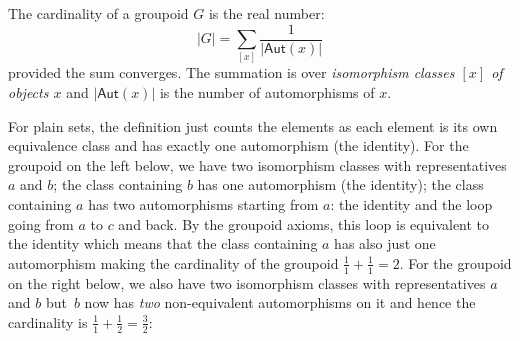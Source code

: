 \begin{definition}
  The cardinality of a groupoid $G$ is the real number:
  \[
    |G| = \sum_{[x]} \frac{1}{|\textsf{Aut}(x)|}
  \]
  provided the sum converges. The summation is over \emph{isomorphism
    classes $[x]$ of objects $x$} and $|\textsf{Aut}(x)|$ is the
  number of automorphisms of $x$.
\end{definition}

For plain sets, the definition just counts the elements as each
element is its own equivalence class and has exactly one automorphism
(the identity). For the groupoid on the left below, we have two
isomorphism classes with representatives $a$ and $b$; the class
containing $b$ has one automorphism (the identity); the class
containing $a$ has two automorphisms starting from $a$: the identity
and the loop going from $a$ to $c$ and back. By the groupoid axioms,
this loop is equivalent to the identity which means that the class
containing $a$ has also just one automorphism making the cardinality
of the groupoid $\frac{1}{1} + \frac{1}{1} = 2$. For the groupoid on
the right below, we also have two isomorphism classes with
representatives $a$ and $b$ but~$b$ now has \emph{two} non-equivalent
automorphisms on it and hence the cardinality is
$\frac{1}{1} + \frac{1}{2} = \frac{3}{2}$:

\begin{center}
\qquad 
{}
\end{center}


